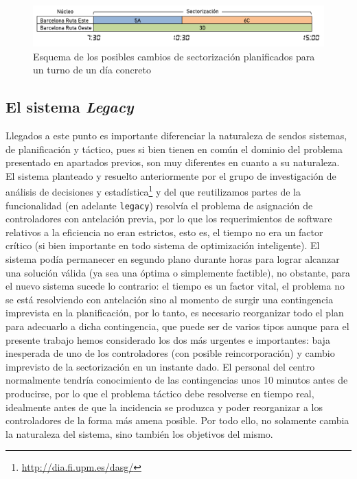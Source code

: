 \begin{figure}[htbp]
	\centering
	\includegraphics[width=\linewidth]{ejemplo-apertura-sectorizaciones}
	\caption{Esquema de los posibles cambios de sectorización planificados para un turno de un día concreto}
	\label{fig:2:ejemplo-apertura-sectorizaciones}
\end{figure}

\subsection{El sistema \textit{Legacy}}
\label{apartado:2:detalles-sistema}
Llegados a este punto es importante diferenciar la naturaleza de sendos sistemas, de planificación y táctico, pues si 
bien tienen en común el dominio del problema presentado en apartados previos, son muy diferentes en cuanto a su 
naturaleza.
\\

El sistema planteado y resuelto anteriormente por el grupo de investigación de análisis de decisiones y 
estadística\footnote{\url{http://dia.fi.upm.es/dasg/}} y 
del que reutilizamos partes de la 
funcionalidad (en adelante \texttt{legacy}) resolvía el problema de asignación de controladores 
con antelación previa, por lo que los requerimientos de software relativos a la eficiencia no eran estrictos, esto es, 
el tiempo no era un factor crítico (si bien importante en todo sistema de optimización inteligente). El sistema podía 
permanecer en segundo plano durante horas para lograr alcanzar una solución válida (ya sea una óptima o simplemente 
factible), no obstante, para el nuevo sistema sucede lo contrario: el tiempo es un factor vital, el problema no se está 
resolviendo con antelación sino al momento de surgir una contingencia imprevista en la planificación, por lo tanto, es 
necesario reorganizar todo el plan para adecuarlo a dicha contingencia, que puede ser de varios tipos aunque para el 
presente trabajo hemos considerado los dos más urgentes e importantes: baja inesperada de uno de los controladores (con 
posible reincorporación) y cambio imprevisto de la sectorización en un instante dado. El personal del centro 
normalmente tendría conocimiento de las contingencias unos 10 minutos antes de producirse, por lo que el problema 
táctico debe resolverse en tiempo real, idealmente antes de que la incidencia se produzca y poder reorganizar a los 
controladores de la forma más amena posible. 
Por todo ello, no solamente cambia la naturaleza del sistema, sino también los objetivos del mismo.
\\

